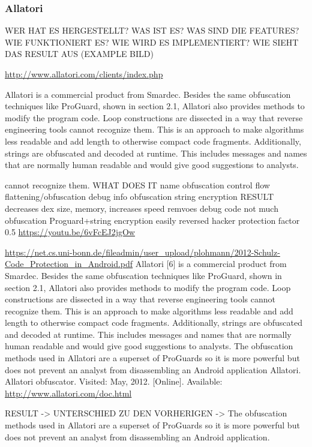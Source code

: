 \subsubsection{Allatori} \label{subsubsection:counter-reengineering-optobf-allatori}

WER HAT ES HERGESTELLT? WAS IST ES? WAS SIND DIE FEATURES? WIE FUNKTIONIERT ES? WIE WIRD ES IMPLEMENTIERT? WIE SIEHT DAS RESULT AUS (EXAMPLE BILD)\newline

\url{http://www.allatori.com/clients/index.php}\newline

Allatori is a commercial product from Smardec.\newline
Besides the same obfuscation techniques like ProGuard, shown in section 2.1, Allatori also provides methods to modify the program code. Loop constructions are dissected in a way that reverse engineering tools cannot recognize them. This is an approach to make algorithms less readable and add length to otherwise compact code fragments. Additionally, strings are obfuscated and decoded at runtime. This includes messages and names that are normally human readable and would give good suggestions to analysts.\newline

cannot recognize them.
WHAT DOES IT\newline
name obfuscation\newline
control flow flattening/obfuscation\newline
debug info obfuscation\newline
string encryption\newline
RESULT\newline
decreases dex size, memory, increases speed\newline
remvoes debug code\newline
not much obfuscation\newline
Proguard+string encryption\newline
easily reversed\newline
hacker protection factor 0.5\newline
\url{https://youtu.be/6vFcEJ2jgOw}


\url{https://net.cs.uni-bonn.de/fileadmin/user_upload/plohmann/2012-Schulz-Code_Protection_in_Android.pdf}\newline
Allatori [6] is a commercial product from Smardec. Besides the same obfuscation techniques
like ProGuard, shown in section 2.1, Allatori also provides methods to modify the
program code. Loop constructions are dissected in a way that reverse engineering tools
cannot recognize them. This is an approach to make algorithms less readable and add
length to otherwise compact code fragments. Additionally, strings are obfuscated and decoded
at runtime. This includes messages and names that are normally human readable
and would give good suggestions to analysts.
The obfuscation methods used in Allatori are a superset of ProGuards so it is more
powerful but does not prevent an analyst from disassembling an Android application\newline
Allatori. Allatori obfuscator. Visited: May, 2012. [Online]. Available: \url{http://www.allatori.com/doc.html}


RESULT -> UNTERSCHIED ZU DEN VORHERIGEN -> The obfuscation methods used in Allatori are a superset of ProGuards so it is more powerful but does not prevent an analyst from disassembling an Android application.

